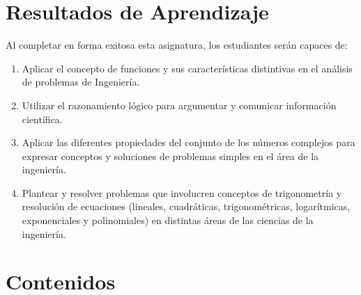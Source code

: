 \documentclass[11pt]{article}
\begin{document}
\section{Resultados de Aprendizaje}
\label{sec:org91621e8}

Al completar en forma exitosa esta asignatura, los estudiantes serán capaces de:

\begin{enumerate}
\item Aplicar el concepto de funciones y sus características distintivas en el análisis de problemas de Ingeniería.

\item Utilizar el razonamiento lógico para argumentar y comunicar información científica.

\item Aplicar las diferentes propiedades del conjunto de los números complejos para expresar conceptos y soluciones de problemas simples en el área de la ingeniería.

\item Plantear y resolver problemas que involucren conceptos de trigonometría y resolución de ecuaciones (lineales, cuadráticas, trigonométricas, logarítmicas, exponenciales y polinomiales) en distintas áreas de las ciencias de la ingeniería.
\end{enumerate}

\section{Contenidos}
\label{sec:org3c37485}
\end{document}
